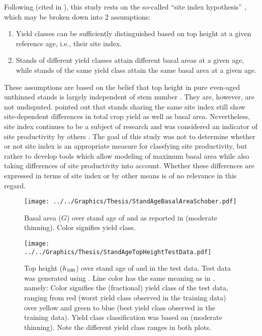 Following \textcite{Baur1881} (cited in \textcite[p. 159]{Assmann1970}), this study rests on the so-called “site index hypothesis” \parencite{Skovsgaard2008}, which may be broken down into 2 assumptions:
\begin{enumerate}
\item Yield classes can be sufficiently distinguished based on top height at a given reference age, i.e., their site index.
\item Stands of different yield classes attain different basal areas at a given age, while stands of the same yield class attain the same basal area at a given age.
\end{enumerate}
These assumptions are based on the belief that top height in pure even-aged unthinned stands is largely independent of stem number \parencite{Skovsgaard2008}.  
They are, however, are not undisputed.  \textcite{Assmann1970} pointed out that stands sharing the same site index still show site-dependent differences in total crop yield as well as basal area.  Nevertheless, site index continues to be a subject of research \parencite{Weiskittel2011,Somarriba2001,Wang2005} and was considered an indicator of site productivity by others \parencite{Monserud1984,Rayner1992,Karlsson1997}.  The goal of this study was not to determine whether or not site index is an appropriate measure for classfying site productivity, but rather to develop tools which allow modeling of maximum basal area while also taking differences of site productivity into account.  Whether these differences are expressed in terms of site index or by other means is of no relevance in this regard.

\begin{figure}[h]
  \centering
  \texttt{[image: ../../Graphics/Thesis/StandAgeBasalAreaSchober.pdf]}
  \caption{Basal area (\(G\)) over stand age of \Beech{} and \Spruce{} as reported in \textcite{Schober1995} (moderate thinning).  Color signifies yield class.}
  \label{fig:StandAgeBasalAreaSchober}
\end{figure}

\begin{figure}[h]
  \centering
  \texttt{[image: ../../Graphics/Thesis/StandAgeTopHeightTestData.pdf]}
  \caption{Top height (\(h_{100}{}\)) over stand age of \Beech{} and \Spruce{} in the test data.  Test data was generated using .  Line color has the same meaning as in , namely:  Color signifies the (fractional) yield class of the test data, ranging from red (worst yield class observed in the training data) over yellow and green to blue (best yield class observed in the training data).  Yield class classification was based on \textcite{Schober1995} (moderate thinning).  Note the different yield class ranges in both plots.}
  \label{fig:StandAgeTopHeightTestData}
\end{figure}


\clearpage{}

